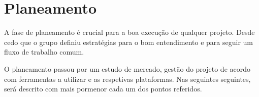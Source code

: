 \chapter[Planeamento]
{Planeamento}

A fase de planeamento é crucial para a boa execução de qualquer projeto. Desde cedo que o grupo definiu estratégias para o bom entendimento e para seguir um fluxo de trabalho comum.

O planeamento passou por um estudo de mercado, gestão do projeto de acordo com ferramentas a utilizar e as respetivas plataformas. Nas seguintes seguintes, será descrito com mais pormenor cada um dos pontos referidos.




